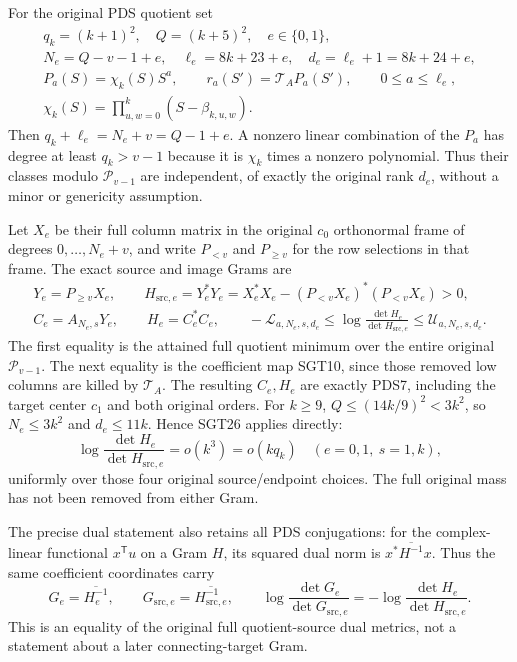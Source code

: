 \documentclass[10pt]{article}
\begin{document}
For the original PDS quotient set
\[
\begin{gathered}
 q_k=(k+1)^2,\quad Q=(k+5)^2,\quad e\in\{0,1\},\\
 N_e=Q-v-1+e,\quad
 \ell_e=8k+23+e,\quad d_e=\ell_e+1=8k+24+e,\\
 P_a(S)=\chi_k(S)S^a,\qquad
 r_a(S')=\mathcal T_AP_a(S'),\qquad 0\le a\le\ell_e,\\
 \chi_k(S)=\prod_{u,w=0}^k(S-\beta_{k,u,w}) .
\end{gathered}\tag{SGT29}
\]
Then $q_k+\ell_e=N_e+v=Q-1+e$. A nonzero linear combination
of the $P_a$ has degree at least $q_k>v-1$ because it is
$\chi_k$ times a nonzero polynomial. Thus their classes modulo
$\mathcal P_{v-1}$ are independent, of exactly the original rank
$d_e$, without a minor or genericity assumption.

Let $X_e$ be their full column matrix in the original
$c_0$ orthonormal frame of degrees $0,\ldots,N_e+v$, and write
$P_{<v}$ and $P_{\ge v}$ for the row selections in that frame.
The exact source and image Grams are
\[
\begin{gathered}
 Y_e=P_{\ge v}X_e,\qquad
 H_{\mathrm{src},e}=Y_e^*Y_e
       =X_e^*X_e-(P_{<v}X_e)^*(P_{<v}X_e)>0,\\
 C_e=A_{N_e,s}Y_e,\qquad
 H_e=C_e^*C_e,\qquad
 -\mathcal L_{a,N_e,s,d_e}
       \le\log\frac{\det H_e}{\det H_{\mathrm{src},e}}
       \le\mathcal U_{a,N_e,s,d_e}.
\end{gathered}\tag{SGT30}
\]
The first equality is the attained full quotient minimum over the
entire original $\mathcal P_{v-1}$. The next equality is the
coefficient map SGT10, since those removed low columns are killed
by $\mathcal T_A$. The resulting $C_e,H_e$ are exactly PDS7,
including the target center $c_1$ and both original orders.
For $k\ge9$, $Q\le(14k/9)^2<3k^2$, so $N_e\le3k^2$ and
$d_e\le11k$. Hence SGT26 applies directly:
\[
 \log\frac{\det H_e}{\det H_{\mathrm{src},e}}
          =o(k^3)=o(kq_k)
 \quad(e=0,1,\ s=1,k),
 \tag{SGT31}
\]
uniformly over those four original source/endpoint choices.
The full original mass has not been removed from either Gram.

The precise dual statement also retains all PDS conjugations:
for the complex-linear functional $x^{\mathsf T}u$ on a Gram $H$,
its squared dual norm is $x^*\overline{H^{-1}}x$.
Thus the same coefficient coordinates carry
\[
 G_e=\overline{H_e^{-1}},\qquad
 G_{\mathrm{src},e}=\overline{H_{\mathrm{src},e}^{-1}},\qquad
 \log\frac{\det G_e}{\det G_{\mathrm{src},e}}
       =-\log\frac{\det H_e}{\det H_{\mathrm{src},e}} .
 \tag{SGT32}
\]
This is an equality of the original full quotient-source dual
metrics, not a statement about a later connecting-target Gram.
\end{document}
